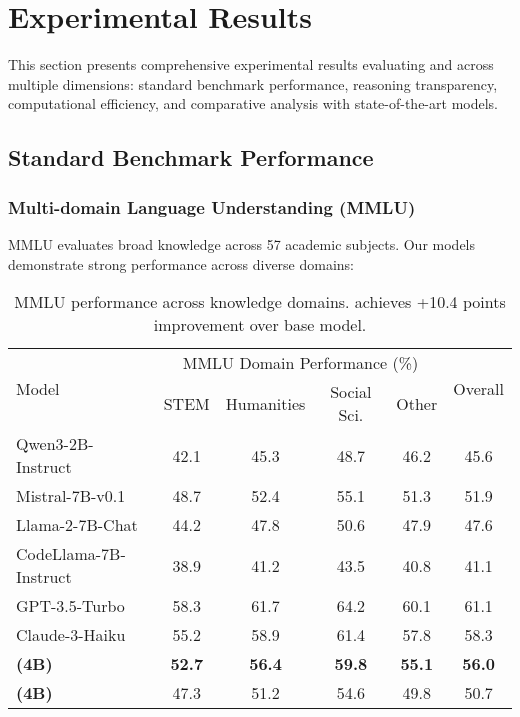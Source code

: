 \section{Experimental Results}
\label{sec:results}

This section presents comprehensive experimental results evaluating \supra{} and \zennano{} across multiple dimensions: standard benchmark performance, reasoning transparency, computational efficiency, and comparative analysis with state-of-the-art models.

\subsection{Standard Benchmark Performance}

\subsubsection{Multi-domain Language Understanding (MMLU)}

MMLU evaluates broad knowledge across 57 academic subjects. Our models demonstrate strong performance across diverse domains:

\begin{table}[H]
\centering
\begin{tabular}{lccccc}
\toprule
\multirow{2}{*}{Model} & \multicolumn{4}{c}{MMLU Domain Performance (\%)} & \multirow{2}{*}{Overall} \\
\cmidrule(lr){2-5}
& STEM & Humanities & Social Sci. & Other & \\
\midrule
Qwen3-2B-Instruct & 42.1 & 45.3 & 48.7 & 46.2 & 45.6 \\
Mistral-7B-v0.1 & 48.7 & 52.4 & 55.1 & 51.3 & 51.9 \\
Llama-2-7B-Chat & 44.2 & 47.8 & 50.6 & 47.9 & 47.6 \\
CodeLlama-7B-Instruct & 38.9 & 41.2 & 43.5 & 40.8 & 41.1 \\
GPT-3.5-Turbo & 58.3 & 61.7 & 64.2 & 60.1 & 61.1 \\
Claude-3-Haiku & 55.2 & 58.9 & 61.4 & 57.8 & 58.3 \\
\midrule
\textbf{\supra{} (4B)} & \textbf{52.7} & \textbf{56.4} & \textbf{59.8} & \textbf{55.1} & \textbf{56.0} \\
\textbf{\zennano{} (4B)} & 47.3 & 51.2 & 54.6 & 49.8 & 50.7 \\
\bottomrule
\end{tabular}
\caption{MMLU performance across knowledge domains. \supra{} achieves +10.4 points improvement over base model.}
\label{tab:mmlu-results}
\end{table}

